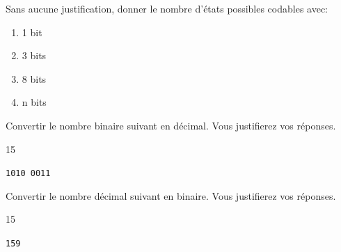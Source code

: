 \documentclass[a4paper,10pt]{report}
\def\ptsexoA{2}
\def\ptsexoB{1}
\def\ptsexoC{1}
\begin{document}

\renewcommand{\labelitemi}{\textbullet} %


\pagestyle{DS_FP}          %
\NomPrenomNote{}


\exods{\ptsexoA}

Sans aucune justification, donner le nombre d'états possibles codables avec:

\begin{enumerate}[1)]
    \item 1 bit \dotfill{}
    \item 3 bits \dotfill{}
    \item 8 bits \dotfill{}
    \item n bits \dotfill{}
\end{enumerate}

\medskip


\begin{minipage}{0.49\linewidth}
 \exods{\ptsexoB}

   Convertir le nombre binaire suivant en décimal. Vous justifierez vos réponses.

\begin{answer}{1}{5} 
    \begin{center}
        \verb|1010 0011|
    \end{center}   
\end{answer}
\end{minipage}\hfill
\begin{minipage}{0.49\linewidth}
     \exods{\ptsexoC}

    Convertir le nombre décimal suivant en binaire. Vous justifierez vos réponses.
\begin{answer}{1}{5} 
    \begin{center}
        \verb|159|
    \end{center}   
\end{answer}
\end{minipage}
\end{document}
